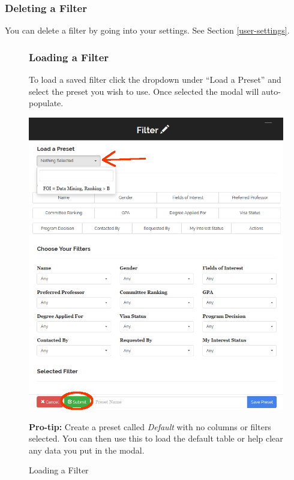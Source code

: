 \documentclass[fontsize=12pt,paper=letter,twoside]{scrartcl}
\begin{document}
\subsubsection{Deleting a Filter}
You can delete a filter by going into your settings. See Section \ref{user-settings}.
\begin{figure}[!htb]
\subsubsection{Loading a Filter}
To load a saved filter click the dropdown under ``Load a Preset'' and select the preset you wish to use. Once selected the modal will auto-populate.
\begin{center}
\includegraphics[width=.99\textwidth]{images/prof/load_filter.png}
\end{center}
\caption{Loading a Filter}
\textbf{Pro-tip:} Create a preset called \emph{Default} with no columns or filters selected. You can then use this to load the default table or help clear any data you put in the modal.
\label{fig:prof/save_filter}
\end{figure}

\clearpage
\end{document}
